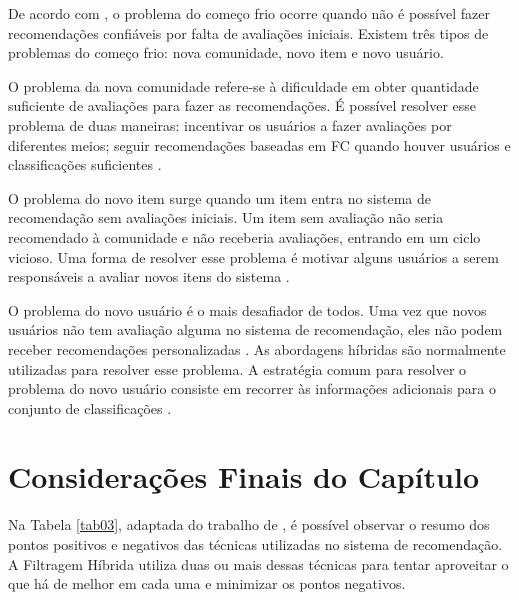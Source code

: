 De acordo com , o problema do começo frio ocorre quando não é possível fazer recomendações 
confiáveis por falta de avaliações iniciais. Existem três tipos de problemas do começo frio: nova comunidade, novo item e novo usuário. 

O problema da nova comunidade refere-se à dificuldade em obter quantidade suficiente de avaliações para fazer as recomendações. É possível 
resolver esse problema de duas maneiras: incentivar os usuários a fazer avaliações por diferentes meios; seguir recomendações baseadas em FC 
quando houver usuários e classificações suficientes \cite{bobadilla2013}.

O problema do novo item surge quando um item entra no sistema de recomendação sem avaliações iniciais. 
Um item sem avaliação não seria recomendado à comunidade e não receberia avaliações, entrando em um ciclo vicioso. Uma forma 
de resolver esse problema é motivar alguns usuários a serem responsáveis a avaliar novos itens do sistema \cite{burke2002}. 

O problema do novo usuário é o mais desafiador de todos. Uma vez que novos usuários não tem 
avaliação alguma no sistema de recomendação, eles não podem receber recomendações personalizadas \cite{burke2002}. As abordagens híbridas são normalmente utilizadas para resolver esse problema. 
A estratégia comum para resolver o problema do novo usuário consiste em recorrer às informações adicionais para o conjunto de classificações \cite{bobadilla2013}.

\section{Considerações Finais do Capítulo}

Na Tabela \ref{tab03}, adaptada do trabalho de , é possível observar o resumo dos pontos positivos e negativos das técnicas utilizadas no sistema de recomendação.
A Filtragem Híbrida utiliza duas ou mais dessas técnicas para tentar aproveitar o que há de melhor em cada uma e minimizar os pontos negativos.


